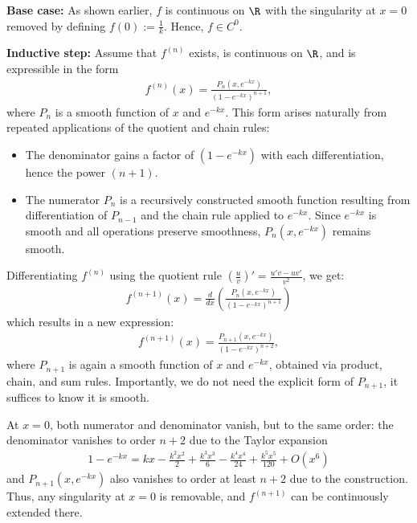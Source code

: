 \begin{Itemize}
    \Item{$\bullet$} \textbf{Base case:} As shown earlier, $f$ is continuous on $\R$ with the singularity at $x = 0$ removed by defining $f(0) := \frac{1}{k}$. Hence, $f \in C^0$.

    \Item{$\bullet$} \textbf{Inductive step:} Assume that $f^{(n)}$ exists, is continuous on $\R$, and is expressible in the form
    \begin{align}
        f^{(n)}(x) = \frac{P_n(x, e^{-kx})}{(1 - e^{-kx})^{n+1}},
    \end{align}
    where $P_n$ is a smooth function of $x$ and $e^{-kx}$. This form arises naturally from repeated applications of the quotient and chain rules:
    
    \begin{itemize}
        \item The denominator gains a factor of $(1 - e^{-kx})$ with each differentiation, hence the power $(n+1)$.
        \item The numerator $P_n$ is a recursively constructed smooth function resulting from differentiation of $P_{n-1}$ and the chain rule applied to $e^{-kx}$. Since $e^{-kx}$ is smooth and all operations preserve smoothness, $P_n(x, e^{-kx})$ remains smooth.
    \end{itemize}
    
    Differentiating $f^{(n)}$ using the quotient rule $\left(\frac{u}{v}\right)' = \frac{u' v - u v'}{v^2}$, we get:
    \begin{align}
        f^{(n+1)}(x) = \frac{d}{dx} \left( \frac{P_n(x, e^{-kx})}{(1 - e^{-kx})^{n+1}} \right)
    \end{align}
    which results in a new expression:
    \begin{align}
        f^{(n+1)}(x) = \frac{P_{n+1}(x, e^{-kx})}{(1 - e^{-kx})^{n+2}},
    \end{align}
    where $P_{n+1}$ is again a smooth function of $x$ and $e^{-kx}$, obtained via product, chain, and sum rules. Importantly, we do not need the explicit form of $P_{n+1}$, it suffices to know it is smooth.

    At $x = 0$, both numerator and denominator vanish, but to the same order: the denominator vanishes to order $n+2$ due to the Taylor expansion
    \begin{align}
        1 - e^{-kx} = kx - \frac{k^2 x^2}{2} + \frac{k^3 x^3}{6} - \frac{k^4 x^4}{24} + \frac{k^5 x^5}{120} + O(x^6)
    \end{align}
    and $P_{n+1}(x, e^{-kx})$ also vanishes to order at least $n+2$ due to the construction. Thus, any singularity at $x = 0$ is removable, and $f^{(n+1)}$ can be continuously extended there.
\end{Itemize}

